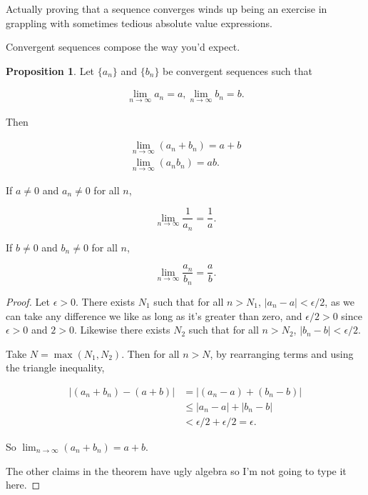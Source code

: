 \documentclass{article}
\theoremstyle{definition}
\newtheorem{proposition}{Proposition}[section]
\begin{document}
Actually proving that a sequence converges winds up being an exercise in grappling with sometimes tedious
absolute value expressions.

Convergent sequences compose the way you'd expect.

\pagebreak

\begin{proposition}
Let $\{a_n\}$ and $\{b_n\}$ be convergent sequences such that

\begin{align*}
\lim_{n \to \infty} a_n = a, \lim_{n \to \infty} b_n = b.
\end{align*}

Then

\begin{align*}
\lim_{n \to \infty} (a_n + b_n) = a + b \\
\lim_{n \to \infty} (a_n b_n) = ab.
\end{align*}

If $a \neq 0$ and $a_n \neq 0$ for all $n$,

\begin{equation*}
\lim_{n \to \infty} \frac{1}{a_n} = \frac{1}{a}.
\end{equation*}

If $b \neq 0$ and $b_n \neq 0$ for all $n$,

\begin{equation*}
\lim_{n \to \infty} \frac{a_n}{b_n} = \frac{a}{b}.
\end{equation*}

\end{proposition}

\begin{proof}
Let $\epsilon > 0$. There exists $N_1$ such that for all $n > N_1$, $|a_n - a| < \epsilon/2$, as we can take any difference we like as long as it's greater than zero, and $\epsilon/2 > 0$ since $\epsilon > 0$ and $2 > 0$. Likewise there exists $N_2$ such that for all $n > N_2$, $|b_n - b| < \epsilon/2$.

Take $N = \max(N_1, N_2)$. Then for all $n > N$, by rearranging terms and using the triangle inequality,

\begin{align*}
|(a_n + b_n) - (a+b)| & =  |(a_n - a) + (b_n - b)| \\
& \leq  |a_n - a| + |b_n - b| \\
& <  \epsilon/2 + \epsilon/2 = \epsilon.
\end{align*}

So $\lim_{n \to \infty} (a_n + b_n) = a + b$.

The other claims in the theorem have ugly algebra so I'm not going to type it here.
\end{proof}
\end{document}
